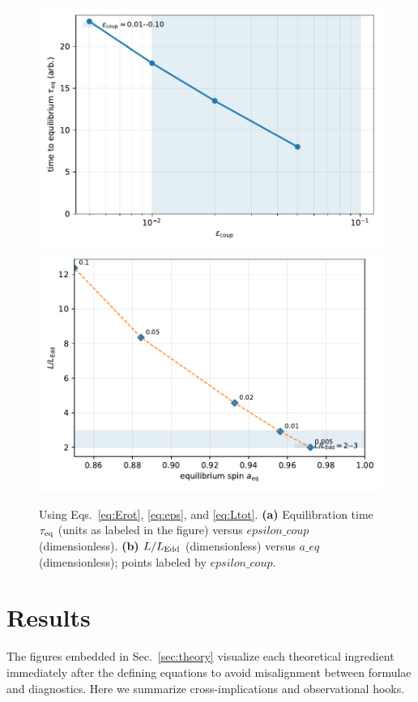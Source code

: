 \documentclass[twocolumn]{aastex701}
\newcommand{\LEdd}{L_{\rm Edd}}
\newcommand{\epscoup}{\epsilon_{\rm coup}}
\newcommand{\aeq}{a_{\rm eq}}
\def\epscoup{epsilon\_coup}\def\aeq{a\_eq}\def\mathrm#1{#1}%
\begin{document}
\begin{figure}[!htbp]
  \vspace*{2pt}
  \centering
  \includegraphics[width=.95\linewidth]{Fig4a.pdf}\\[4pt]
  \includegraphics[width=.95\linewidth]{Fig4b.pdf}
  \caption{Using Eqs.~\eqref{eq:Erot}, \eqref{eq:eps}, and \eqref{eq:Ltot}. \textbf{(a)} Equilibration time $\tau_{\rm eq}$ (units as labeled in the figure) versus $\epscoup$ (dimensionless). \textbf{(b)} $L/\LEdd$ (dimensionless) versus $\aeq$ (dimensionless); points labeled by $\epscoup$.}
  \label{fig:fig4}
\end{figure}

\section{Results}\label{sec:results}
The figures embedded in Sec.~\ref{sec:theory} visualize each theoretical ingredient immediately after the defining equations to avoid misalignment between formulae and diagnostics. Here we summarize cross-implications and observational hooks.
\end{document}
